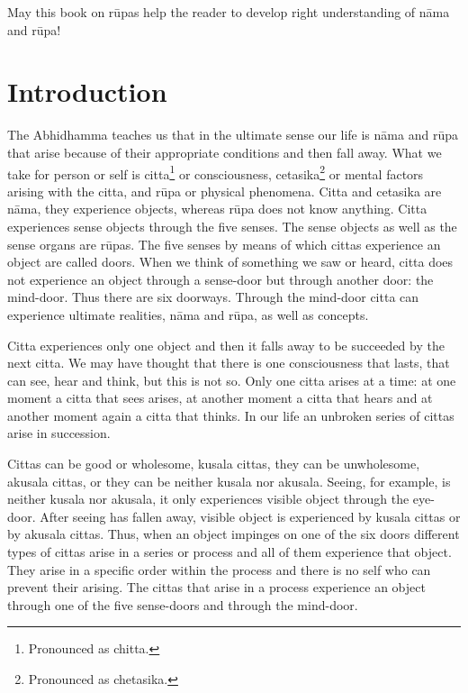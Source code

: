 \documentclass{book}
\begin{document}
May this book on r\=upas help the reader to develop right understanding
of n{\=a}ma and r\=upa! 

\chapter{Introduction}  






The Abhidhamma teaches us that in the ultimate sense our life is
n{\=a}ma and r\=upa that arise because of their appropriate conditions
and then fall away. What we take for person or self is citta\footnote{Pronounced as chitta.} or consciousness, cetasika\footnote{Pronounced as chetasika.} or mental factors arising with the citta, and r\=upa or physical
phenomena. Citta and cetasika are n{\=a}ma, they experience objects,
whereas r\=upa does not know anything. Citta experiences sense objects
through the five senses. The sense objects as well as the sense organs
are r\=upas. The five senses by means of which cittas experience an
object are called doors. When we think of something we saw or heard,
citta does not experience an object through a sense-door but through
another door: the mind-door. Thus there are six doorways. Through the
mind-door citta can experience ultimate realities, n{\=a}ma and
r\=upa, as well as concepts.

Citta experiences only one object and then it falls away to be succeeded
by the next citta. We may have thought that there is one consciousness
that lasts, that can see, hear and think, but this is not so. Only one
citta arises at a time: at one moment a citta that sees arises, at
another moment a citta that hears and at another moment again a citta
that thinks. In our life an unbroken series of cittas arise in
succession.

Cittas can be good or wholesome, kusala cittas, they can be unwholesome,
akusala cittas, or they can be neither kusala nor akusala. Seeing, for
example, is neither kusala nor akusala, it only experiences visible
object through the eye-door. After seeing has fallen away, visible
object is experienced by kusala cittas or by akusala cittas. Thus, when
an object impinges on one of the six doors different types of cittas
arise in a series or process and all of them experience that object.
They arise in a specific order within the process and there is no self
who can prevent their arising. The cittas that arise in a process
experience an object through one of the five sense-doors and through
the mind-door. 
\end{document}
